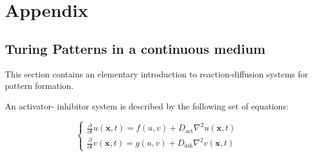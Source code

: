 \chapter{Appendix}
\section{Turing Patterns in a continuous medium}

This section contains an elementary introduction to reaction-diffusion systems for pattern formation. 

An activator- inhibitor system is described by the following set of equations:

\begin{equation}
\begin{cases}
\frac{\partial}{\partial t} u(\mathbf{x}, t) = f(u, v) + D_{\text{act}} \nabla^2 u(\mathbf{x}, t) \\
\frac{\partial}{\partial t} v(\mathbf{x}, t) = g(u, v) + D_{\text{inh}} \nabla^2 v(\mathbf{x}, t)
\end{cases}
\end{equation}

